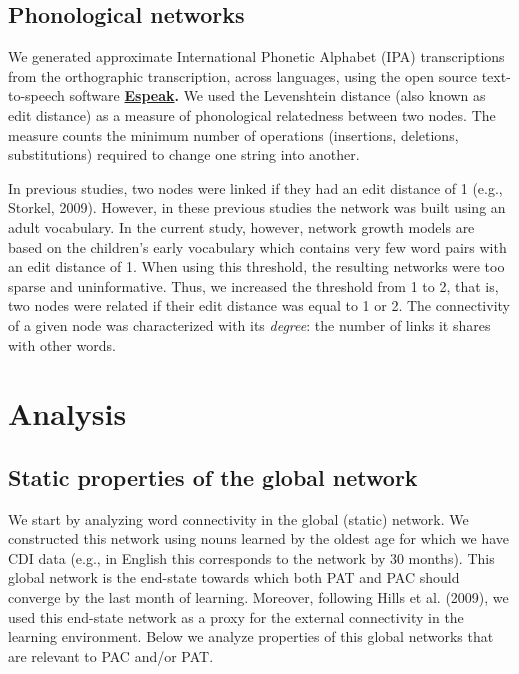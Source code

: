 \documentclass[english,floatsintext,man]{apa6}
\theoremstyle{definition}
\theoremstyle{definition}
\theoremstyle{definition}
\theoremstyle{remark}
\begin{document}
\subsection{Phonological networks}\label{phonological-networks}

We generated approximate International Phonetic Alphabet (IPA)
transcriptions from the orthographic transcription, across languages,
using the open source text-to-speech software
\textbf{\href{http://http://espeak.sourceforge.net/}{Espeak}.} We used
the Levenshtein distance (also known as edit distance) as a measure of
phonological relatedness between two nodes. The measure counts the
minimum number of operations (insertions, deletions, substitutions)
required to change one string into another.

In previous studies, two nodes were linked if they had an edit distance
of 1 (e.g., Storkel, 2009). However, in these previous studies the
network was built using an adult vocabulary. In the current study,
however, network growth models are based on the children's early
vocabulary which contains very few word pairs with an edit distance of
1. When using this threshold, the resulting networks were too sparse and
uninformative. Thus, we increased the threshold from 1 to 2, that is,
two nodes were related if their edit distance was equal to 1 or 2. The
connectivity of a given node was characterized with its \emph{degree}:
the number of links it shares with other words.

\section{Analysis}\label{analysis}

\subsection{Static properties of the global
network}\label{static-properties-of-the-global-network}

We start by analyzing word connectivity in the global (static) network.
We constructed this network using nouns learned by the oldest age for
which we have CDI data (e.g., in English this corresponds to the network
by 30 months). This global network is the end-state towards which both
PAT and PAC should converge by the last month of learning. Moreover,
following Hills et al. (2009), we used this end-state network as a proxy
for the external connectivity in the learning environment. Below we
analyze properties of this global networks that are relevant to PAC
and/or PAT.
\end{document}
